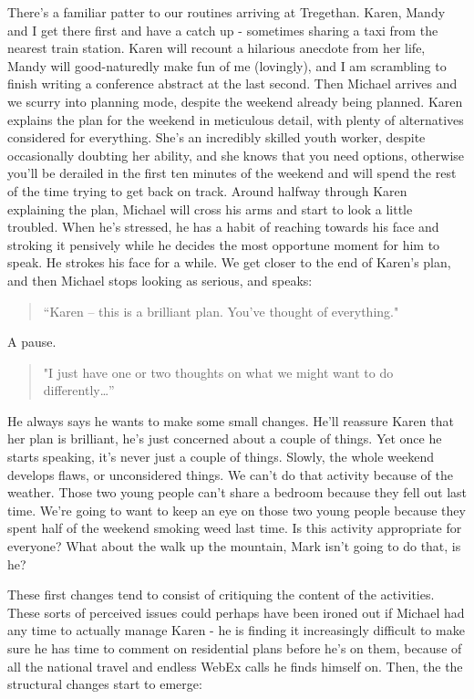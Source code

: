 There's a familiar patter to our routines arriving at Tregethan. Karen, Mandy and I get there first and have a catch up - sometimes sharing a taxi from the nearest train station. Karen will recount a hilarious anecdote from her life,  Mandy will good-naturedly make fun of me (lovingly), and I am scrambling to finish writing a conference abstract at the last second. Then Michael arrives and we scurry into planning mode, despite the weekend already being planned. Karen explains the plan for the weekend in meticulous detail, with plenty of alternatives considered for everything. She's an incredibly skilled youth worker, despite occasionally doubting her ability, and she knows that you need options, otherwise you'll be derailed in the first ten minutes of the weekend and will spend the rest of the time trying to get back on track. Around halfway through Karen explaining the plan, Michael will cross his arms and start to look a little troubled. When he’s stressed, he has a habit of reaching towards his face and stroking it pensively while he decides the most opportune moment for him to speak. He strokes his face for a while. We get closer to the end of Karen’s plan, and then Michael stops looking as serious, and speaks:
\begin{quote}
“Karen – this is a brilliant plan. You’ve thought of everything."\end{quote} A pause. \begin{quote}
"I just have one or two thoughts on what we might want to do differently…”
\end{quote}
He always says he wants to make some small changes. He'll reassure Karen that her plan is brilliant, he’s just concerned about a couple of things. Yet once he starts speaking, it’s never just a couple of things. Slowly, the whole weekend develops flaws, or unconsidered things. We can’t do that activity because of the weather. Those two young people can’t share a bedroom because they fell out last time. We’re going to want to keep an eye on those two young people because they spent half of the weekend smoking weed last time. Is this activity appropriate for everyone? What about the walk up the mountain, Mark isn’t going to do that, is he? 

These first changes tend to consist of critiquing the content of the activities. These sorts of perceived issues could perhaps have been ironed out if Michael had any time to actually manage Karen - he is finding it increasingly difficult to make sure he has time to comment on residential plans before he's on them, because of all the national travel and endless WebEx calls he finds himself on. Then, the the structural changes start to emerge:

